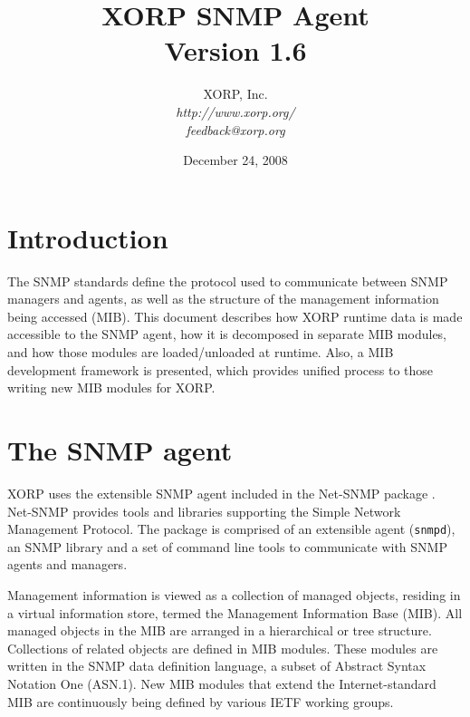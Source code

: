 \documentclass[11pt]{article}
\begin{document}
\title{XORP SNMP Agent \\
\vspace{1ex}
Version 1.6}
\author{ XORP, Inc.					\\
         {\it http://www.xorp.org/}			\\
	 {\it feedback@xorp.org}
}
\date{December 24, 2008}

\maketitle


\section{Introduction}

The SNMP standards \cite{STD0062} define the protocol used to communicate
between SNMP managers and agents, as well as the structure of the management
information being accessed (MIB).  This document describes how XORP runtime data
is made accessible to the SNMP agent, how it is decomposed in separate MIB
modules, and how those modules are loaded/unloaded at runtime.  Also, a MIB
development framework is presented, which provides unified process to those
writing new MIB modules for XORP.

\section{The SNMP agent}

XORP uses the extensible SNMP agent included in the Net-SNMP package
\cite{net-snmp}.  Net-SNMP provides tools and libraries supporting the Simple
Network Management Protocol.  The package is comprised of an extensible agent
(\texttt{snmpd}), an SNMP library and a set of command line tools to
communicate with SNMP agents and managers. 

Management information is viewed as a collection of managed objects, residing
in a virtual information store, termed the Management Information Base (MIB).
All managed objects in the MIB are arranged in a hierarchical or tree
structure.  Collections of related objects are defined in MIB modules.  These
modules are written in the SNMP data definition language, a subset of Abstract
Syntax Notation One (ASN.1).  New MIB modules that extend the Internet-standard
MIB are continuously being defined by various IETF working groups.  
\end{document}
